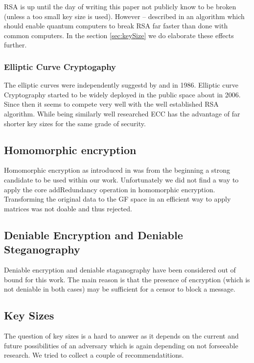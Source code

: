 RSA is up until the day of writing this paper not publicly know to be broken (unless a too small key size is used). However -- \citeauthor{Shor97polynomial-timealgorithms} described in \citeyear{Shor97polynomial-timealgorithms} an algorithm which should enable quantum computers to break RSA far faster than done with common computers. In the section \ref{sec:keySize} we do elaborate these effects further.

\subsubsection{Elliptic Curve Cryptogaphy}
The elliptic curves were independently suggestd by \cite{Miller1986} and \cite{Koblitz04guideto} in 1986. Elliptic curve Cryptography started to be widely deployed in the public space about in 2006. Since then it seems to compete very well with the well established RSA algorithm. While being similarly well researched ECC has the advantage of far shorter key sizes for the same grade of security.

\subsection{Homomorphic encryption}
Homomorphic encryption as introduced in \cite{feldman1987practical} was from the beginning a strong candidate to be used within our work. Unfortunately we did not find a way to apply the core addRedundancy operation in homomorphic encryption. Transforming the original data to the GF space in an efficient way to apply matrices was not doable and thus rejected.


\subsection{Deniable Encryption and Deniable Steganography}
Deniable encryption and deniable staganography have been considered out of bound for this work. The main reason is that the presence of encryption (which is not deniable in both cases) may be sufficient for a censor to block a message.

\subsection{Key Sizes\label{sec:keySize}}
The question of key sizes is a hard to answer as it depends on the current and future possibilities of an adversary which is again depending on not forseeable research. We tried to collect a couple of recommendatitions.

